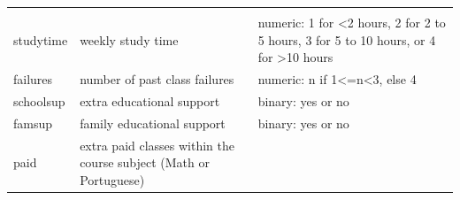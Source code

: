 \documentclass[]{article}
\begin{document}
\begin{longtable}[]{@{}lll@{}}
\begin{minipage}[t]{0.58\columnwidth}
\end{minipage}\tabularnewline
\begin{minipage}[t]{0.05\columnwidth}\raggedright
studytime\strut
\end{minipage} & \begin{minipage}[t]{0.28\columnwidth}\raggedright
weekly study time\strut
\end{minipage} & \begin{minipage}[t]{0.58\columnwidth}\raggedright
numeric: 1 for \textless{}2 hours, 2 for 2 to 5 hours, 3 for 5 to 10
hours, or 4 for \textgreater{}10 hours\strut
\end{minipage}\tabularnewline
\begin{minipage}[t]{0.05\columnwidth}\raggedright
failures\strut
\end{minipage} & \begin{minipage}[t]{0.28\columnwidth}\raggedright
number of past class failures\strut
\end{minipage} & \begin{minipage}[t]{0.58\columnwidth}\raggedright
numeric: n if 1\textless{}=n\textless{}3, else 4\strut
\end{minipage}\tabularnewline
\begin{minipage}[t]{0.05\columnwidth}\raggedright
schoolsup\strut
\end{minipage} & \begin{minipage}[t]{0.28\columnwidth}\raggedright
extra educational support\strut
\end{minipage} & \begin{minipage}[t]{0.58\columnwidth}\raggedright
binary: yes or no\strut
\end{minipage}\tabularnewline
\begin{minipage}[t]{0.05\columnwidth}\raggedright
famsup\strut
\end{minipage} & \begin{minipage}[t]{0.28\columnwidth}\raggedright
family educational support\strut
\end{minipage} & \begin{minipage}[t]{0.58\columnwidth}\raggedright
binary: yes or no\strut
\end{minipage}\tabularnewline
\begin{minipage}[t]{0.05\columnwidth}\raggedright
paid\strut
\end{minipage} & \begin{minipage}[t]{0.28\columnwidth}\raggedright
extra paid classes within the course subject (Math or Portuguese)\strut

\end{minipage}
\end{longtable}
\end{document}
